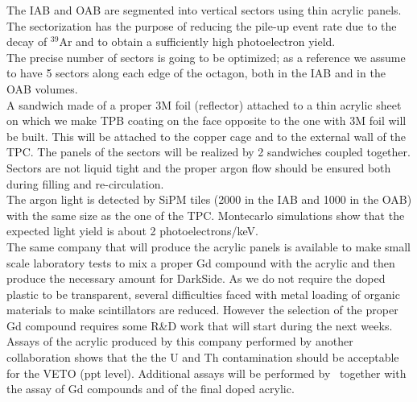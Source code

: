The IAB and OAB are segmented  into vertical sectors using thin acrylic panels. The sectorization has the purpose of  reducing the pile-up event rate due to the decay of $^{39}$Ar  and to obtain a sufficiently high  photoelectron yield.\\
The precise number of sectors is going to be optimized; as a reference we assume to have 5 sectors along each edge of the octagon, both in the IAB and in the OAB volumes. \\
A sandwich made of a proper 3M foil (reflector) attached to a thin acrylic sheet on which we make  TPB coating on the face opposite to the one with 3M foil will be built. This will be attached to the
copper cage and to the external wall of the TPC. The panels of the sectors will be realized by 2 sandwiches coupled together.\\
Sectors are not liquid tight and the proper argon  flow should be ensured both during filling and re-circulation.\\
The argon light is detected by SiPM tiles (2000 in the IAB and 1000 in the OAB) with the same size as the one of the TPC. Montecarlo simulations show that the expected light yield is about 2 photoelectrons/keV.\\
The same company that will produce the acrylic panels is available to make
small scale laboratory tests to mix a proper Gd compound with the acrylic and then produce the  necessary amount for DarkSide. As we do not require  the doped plastic to be transparent, several difficulties faced with metal loading of organic materials to make scintillators are reduced. However the selection of the proper Gd compound requires some R\&D work that will start during the next weeks. Assays of the acrylic produced by this company performed by another collaboration shows that the the U and Th
contamination should be acceptable for the VETO (ppt level). 
Additional assays will be performed by \DSk\ together with the assay of Gd compounds and of the final doped acrylic.

